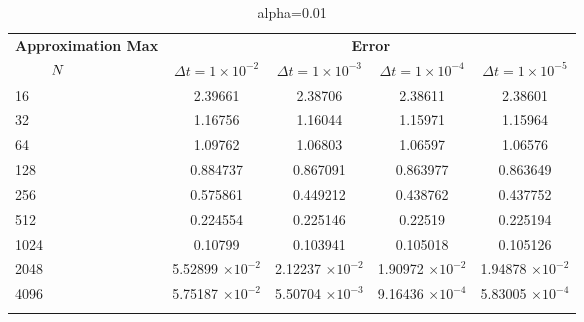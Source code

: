 \begin{table}
	\begin{tabular}{lcccc}
		\toprule
		\multicolumn{1}{c}{\textbf{Approximation Max}} & \multicolumn{4}{c}{\textbf{Error}} \\
		$\hspace{9mm}N$ & $\Delta t=1\times 10^{-2}$ & $\Delta t=1\times 10^{-3}$ & $\Delta t=1\times 10^{-4}$ & $\Delta t=1\times 10^{-5}$ \\
		\midrule
		\hspace{7mm} 16 & 2.39661   & 2.38706    & 2.38611     & 2.38601     \\
		\midrule
		\hspace{7mm} 32 & 1.16756   & 1.16044    & 1.15971     & 1.15964     \\
		\midrule
		\hspace{7mm} 64 & 1.09762   & 1.06803    & 1.06597     & 1.06576     \\
		\midrule
		\hspace{7mm} 128 & 0.884737  & 0.867091   & 0.863977    & 0.863649    \\
		\midrule
		\hspace{7mm} 256 & 0.575861  & 0.449212   & 0.438762    & 0.437752    \\
		\midrule
		\hspace{7mm} 512 & 0.224554  & 0.225146   & 0.22519     & 0.225194    \\
		\midrule
		\hspace{7mm} 1024 & 0.10799   & 0.103941   & 0.105018    & 0.105126    \\
		\midrule
		\hspace{7mm} 2048 & 5.52899 $\times 10 ^{-2}$ & 2.12237 $\times 10 ^{-2}$ & 1.90972 $\times 10 ^{-2}$  & 1.94878 $\times 10 ^{-2}$   \\
		\midrule
		\hspace{7mm} 4096 & 5.75187 $\times 10 ^{-2}$ & 5.50704 $\times 10 ^{-3}$ & 9.16436 $\times 10 ^{-4}$ & 5.83005 $\times 10 ^{-4}$ \\
		\\
		\bottomrule
	\end{tabular}
	\caption{alpha=0.01}
\end{table}

